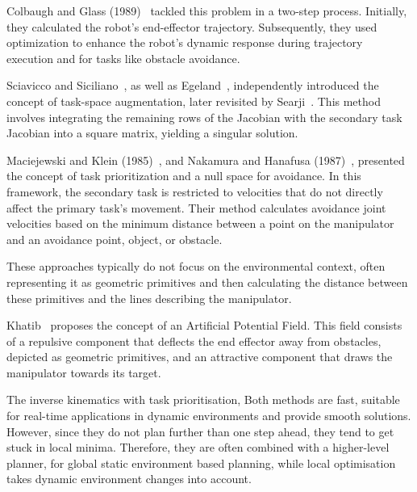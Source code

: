 \documentclass[letterpaper, 10 pt, conference]{ieeeconf}  %
\begin{document}
Colbaugh and Glass (1989)~\cite{c31, c32} tackled this problem in a two-step process. Initially, they calculated the robot's end-effector trajectory. Subsequently, they used optimization to enhance the robot's dynamic response during trajectory execution and for tasks like obstacle avoidance.

Sciavicco and Siciliano~\cite{c34, c35}, as well as Egeland~\cite{c36}, independently introduced the concept of task-space augmentation, later revisited by Searji~\cite{c37}. This method involves integrating the remaining rows of the Jacobian with the secondary task Jacobian into a square matrix, yielding a singular solution.

Maciejewski and Klein (1985)~\cite{c29}, and Nakamura and Hanafusa (1987)~\cite{c38}, presented the concept of task prioritization and a null space for avoidance. In this framework, the secondary task is restricted to velocities that do not directly affect the primary task's movement. Their method calculates avoidance joint velocities based on the minimum distance between a point on the manipulator and an avoidance point, object, or obstacle.

These approaches typically do not focus on the environmental context, often representing it as geometric primitives and then calculating the distance between these primitives and the lines describing the manipulator.

Khatib~\cite{c33} proposes the concept of an Artificial Potential Field. This field consists of a repulsive component that deflects the end effector away from obstacles, depicted as geometric primitives, and an attractive component that draws the manipulator towards its target.




 The inverse kinematics with task prioritisation,  Both methods are fast, suitable for real-time applications in dynamic environments and provide smooth solutions. However, since they do not plan further than one step ahead, they tend to get stuck in local minima. Therefore, they are often combined with a higher-level planner, for global static environment based  planning, while local optimisation takes dynamic environment changes into account.
\end{document}
